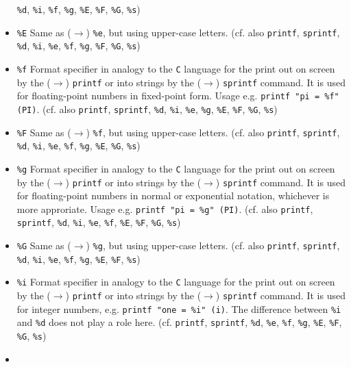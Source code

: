 \documentclass[12pt]{book}
\newcommand{\ttt}[1]{\texttt{#1}}
\begin{document}
\begin{itemize}
\ttt{\%d}, \ttt{\%i}, \ttt{\%f}, \ttt{\%g}, \ttt{\%E}, \ttt{\%F},
\ttt{\%G}, \ttt{\%s})
\item
\ttt{\%E} \newline
Same as ($\to$) \ttt{\%e}, but using upper-case letters.  (cf. also
\ttt{printf}, \ttt{sprintf}, \ttt{\%d}, \ttt{\%i}, \ttt{\%e}, \ttt{\%f},
\ttt{\%g}, \ttt{\%F}, \ttt{\%G}, \ttt{\%s})
\item
\ttt{\%f} \newline
Format specifier in analogy to the \ttt{C} language for the print out
on screen by the ($\to$) \ttt{printf} or into strings by the ($\to$)
\ttt{sprintf} command. It is used for floating-point numbers in
fixed-point form. Usage e.g. \ttt{printf "pi =
\%f" (PI)}.  (cf. also \ttt{printf}, \ttt{sprintf},
\ttt{\%d}, \ttt{\%i}, \ttt{\%e}, \ttt{\%g}, \ttt{\%E}, \ttt{\%F},
\ttt{\%G}, \ttt{\%s})
\item
\ttt{\%F} \newline
Same as ($\to$) \ttt{\%f}, but using upper-case letters.  (cf. also
\ttt{printf}, \ttt{sprintf}, \ttt{\%d}, \ttt{\%i}, \ttt{\%e}, \ttt{\%f},
\ttt{\%g}, \ttt{\%E}, \ttt{\%G}, \ttt{\%s})
\item
\ttt{\%g} \newline
Format specifier in analogy to the \ttt{C} language for the print out
on screen by the ($\to$) \ttt{printf} or into strings by the ($\to$)
\ttt{sprintf} command. It is used for floating-point numbers in
normal or exponential notation, whichever is more approriate. Usage
e.g. \ttt{printf "pi = \%g" (PI)}.  (cf. also \ttt{printf}, \ttt{sprintf},
\ttt{\%d}, \ttt{\%i}, \ttt{\%e}, \ttt{\%f}, \ttt{\%E}, \ttt{\%F},
\ttt{\%G}, \ttt{\%s})
\item
\ttt{\%G} \newline
Same as ($\to$) \ttt{\%g}, but using upper-case letters.  (cf. also
\ttt{printf}, \ttt{sprintf}, \ttt{\%d}, \ttt{\%i}, \ttt{\%e}, \ttt{\%f},
\ttt{\%g}, \ttt{\%E}, \ttt{\%F}, \ttt{\%s})
\item
\ttt{\%i} \newline
Format specifier in analogy to the \ttt{C} language for the print out
on screen by the ($\to$) \ttt{printf} or into strings by the ($\to$)
\ttt{sprintf} command. It is used for integer numbers,
e.g. \ttt{printf "one = \%i" (i)}. The difference between \ttt{\%i}
and \ttt{\%d} does not play a role here. (cf. \ttt{printf}, \ttt{sprintf},
\ttt{\%d}, \ttt{\%e}, \ttt{\%f}, \ttt{\%g}, \ttt{\%E}, \ttt{\%F},
\ttt{\%G}, \ttt{\%s})
\item

\end{itemize}
\end{document}
